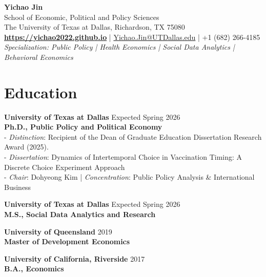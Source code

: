 \documentclass[11pt]{article}
\begin{document}
\begin{center}
    {\huge \textbf{Yichao Jin}} \\
    \vspace{0.5em}
    School of Economic, Political and Policy Sciences \\
    The University of Texas at Dallas, Richardson, TX 75080 \\
    \vspace{0.5em}
    \href{https://yichao2022.github.io}{\textbf{https://yichao2022.github.io}} \quad | \quad \href{mailto:Yichao.Jin@UTDallas.edu}{Yichao.Jin@UTDallas.edu} \quad | \quad +1 (682) 266-4185 \\
    \vspace{0.5em}
    \textit{Specialization: Public Policy | Health Economics | Social Data Analytics | Behavioral Economics}
\end{center}

\vspace{1em}
\noindent\hrulefill

\section*{Education}
\textbf{University of Texas at Dallas} \hfill Expected Spring 2026 \\
\textbf{Ph.D., Public Policy and Political Economy} \\
- \textit{Distinction}: Recipient of the Dean of Graduate Education Dissertation Research Award (2025). \\
- \textit{Dissertation}: Dynamics of Intertemporal Choice in Vaccination Timing: A Discrete Choice Experiment Approach \\
- \textit{Chair}: Dohyeong Kim \quad | \quad \textit{Concentration}: Public Policy Analysis \& International Business

\vspace{0.5em}
\noindent \textbf{University of Texas at Dallas} \hfill Expected Spring 2026 \\
\textbf{M.S., Social Data Analytics and Research}

\vspace{0.5em}
\noindent \textbf{University of Queensland} \hfill 2019 \\
\textbf{Master of Development Economics}

\vspace{0.5em}
\noindent \textbf{University of California, Riverside} \hfill 2017 \\
\textbf{B.A., Economics}
\end{document}
